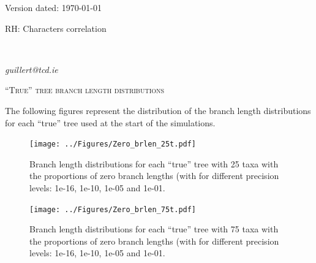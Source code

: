 \documentclass[12pt,letterpaper]{article}
\renewcommand{\section}[1]{%
\bigskip
\begin{center}
\begin{Large}
\normalfont\scshape #1
\medskip
\end{Large}
\end{center}}
\begin{document}
\begin{flushright}
Version dated: \today
\end{flushright}

\bigskip
\noindent RH: Characters correlation
\bigskip
\medskip
\begin{center}
\bigskip


\\

\end{center}
\medskip
{} \textit{guillert@tcd.ie}\\ 
\vspace{1in}


\newpage

\section{``True'' tree branch length distributions}

The following figures represent the distribution of the branch length distributions for each ``true'' tree used at the start of the simulations.

\begin{figure}[!htbp]
\centering
   \texttt{[image: ../Figures/Zero\_brlen\_25t.pdf]}
\caption{Branch length distributions for each ``true'' tree with 25 taxa with the proportions of zero branch lengths (with for different precision levels: 1e-16, 1e-10, 1e-05 and 1e-01.}
\end{figure}

\begin{figure}[!htbp]
\centering
   \texttt{[image: ../Figures/Zero\_brlen\_75t.pdf]}
\caption{Branch length distributions for each ``true'' tree with 75 taxa with the proportions of zero branch lengths (with for different precision levels: 1e-16, 1e-10, 1e-05 and 1e-01.}
\end{figure}
\end{document}
